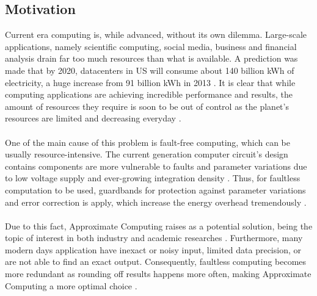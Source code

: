 \subsection{Motivation}

Current era computing is, while advanced, without its own dilemma. Large-scale applications, namely scientific computing, social media, business and financial analysis drain far too much resources than what is available. A prediction was made that by 2020, datacenters in US will consume about 140 billion kWh of electricity, a huge increase from 91 billion kWh in 2013 \cite{NRDC}. It is clear that while computing applications are achieving incredible performance and results, the amount of resources they require is soon to be out of control as the planet's resources are limited and decreasing everyday \cite{AxCSurvey}. \\
~\\
One of the main cause of this problem is fault-free computing, which can be usually resource-intensive. The current generation computer circuit's design contains components are more vulnerable to faults and parameter variations due to low voltage supply and ever-growing integration density \cite{1322441}. Thus, for faultless computation to be used, guardbands for protection against parameter variations and error correction is apply, which increase the energy overhead tremendously \cite{7348659}. \\
~\\
Due to this fact, Approximate Computing raises as a potential solution, being the topic of interest in both industry and academic researches \cite{7348659}. Furthermore, many modern days application have inexact or noisy input, limited data precision, or are not able to find an exact output. Consequently, faultless computing becomes more redundant as rounding off results happens more often, making Approximate Computing a more optimal choice \cite{AxCSurvey}. \\


